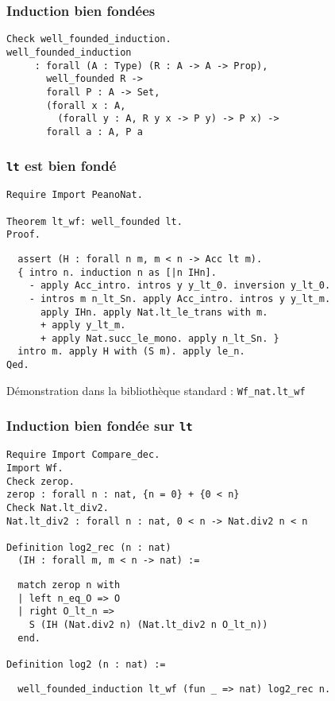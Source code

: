 \documentclass{beamer}
\begin{document}
\begin{frame}[fragile]
  \frametitle{Induction bien fondées}

\begin{verbatim}
Check well_founded_induction.
well_founded_induction
     : forall (A : Type) (R : A -> A -> Prop),
       well_founded R ->
       forall P : A -> Set,
       (forall x : A,
         (forall y : A, R y x -> P y) -> P x) ->
       forall a : A, P a
\end{verbatim}
\end{frame}

\begin{frame}[fragile]
  \frametitle{\texttt{lt} est bien fondé}

\begin{verbatim}
Require Import PeanoNat.

Theorem lt_wf: well_founded lt.
Proof.
\end{verbatim}
\pause
\begin{verbatim}
  assert (H : forall n m, m < n -> Acc lt m).
  { intro n. induction n as [|n IHn].
    - apply Acc_intro. intros y y_lt_0. inversion y_lt_0.
    - intros m n_lt_Sn. apply Acc_intro. intros y y_lt_m.
      apply IHn. apply Nat.lt_le_trans with m.
      + apply y_lt_m.
      + apply Nat.succ_le_mono. apply n_lt_Sn. }
  intro m. apply H with (S m). apply le_n.
Qed.
\end{verbatim}

Démonstration dans la bibliothèque standard : \texttt{Wf_nat.lt_wf}
\end{frame}

\begin{frame}[fragile]
  \frametitle{Induction bien fondée sur \texttt{lt}}

\begin{verbatim}
Require Import Compare_dec.
Import Wf.
Check zerop.
zerop : forall n : nat, {n = 0} + {0 < n}
Check Nat.lt_div2.
Nat.lt_div2 : forall n : nat, 0 < n -> Nat.div2 n < n

Definition log2_rec (n : nat)
  (IH : forall m, m < n -> nat) :=
\end{verbatim}
\pause
\begin{verbatim}
  match zerop n with
  | left n_eq_O => O
  | right O_lt_n =>
    S (IH (Nat.div2 n) (Nat.lt_div2 n O_lt_n))
  end.

Definition log2 (n : nat) :=
\end{verbatim}
\pause
\begin{verbatim}
  well_founded_induction lt_wf (fun _ => nat) log2_rec n.
\end{verbatim}
\end{frame}
\end{document}
